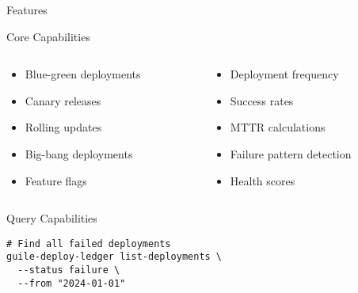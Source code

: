 \documentclass[presentation,aspectratio=169]{beamer}
\begin{document}
\begin{frame}[label={sec:orgb2085a8},fragile]{Features}
 \begin{block}{Core Capabilities}
\begin{columns}
\begin{column}{0.5\columnwidth}
\begin{itemize}
\item Blue-green deployments
\item Canary releases
\item Rolling updates
\item Big-bang deployments
\item Feature flags
\end{itemize}
\end{column}
\begin{column}{0.5\columnwidth}
\begin{itemize}
\item Deployment frequency
\item Success rates
\item MTTR calculations
\item Failure pattern detection
\item Health scores
\end{itemize}
\end{column}
\end{columns}
\end{block}
\begin{block}{Query Capabilities}
\begin{verbatim}
# Find all failed deployments
guile-deploy-ledger list-deployments \
  --status failure \
  --from "2024-01-01"


\end{verbatim}
\end{block}
\end{frame}
\end{document}
